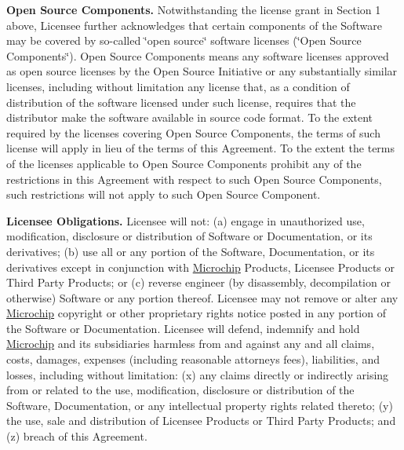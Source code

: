 \begin{DoxyEnumerate}
\item {\bfseries Open Source Components.} Notwithstanding the license grant in Section 1 above, Licensee further acknowledges that certain components of the Software may be covered by so-\/called \char`\"{}open source\char`\"{} software licenses (\char`\"{}\+Open Source Components\char`\"{}). Open Source Components means any software licenses approved as open source licenses by the Open Source Initiative or any substantially similar licenses, including without limitation any license that, as a condition of distribution of the software licensed under such license, requires that the distributor make the software available in source code format. To the extent required by the licenses covering Open Source Components, the terms of such license will apply in lieu of the terms of this Agreement. To the extent the terms of the licenses applicable to Open Source Components prohibit any of the restrictions in this Agreement with respect to such Open Source Components, such restrictions will not apply to such Open Source Component.


\item {\bfseries Licensee Obligations.} Licensee will not\+: (a) engage in unauthorized use, modification, disclosure or distribution of Software or Documentation, or its derivatives; (b) use all or any portion of the Software, Documentation, or its derivatives except in conjunction with \hyperlink{namespace_microchip}{Microchip} Products, Licensee Products or Third Party Products; or (c) reverse engineer (by disassembly, decompilation or otherwise) Software or any portion thereof. Licensee may not remove or alter any \hyperlink{namespace_microchip}{Microchip} copyright or other proprietary rights notice posted in any portion of the Software or Documentation. Licensee will defend, indemnify and hold \hyperlink{namespace_microchip}{Microchip} and its subsidiaries harmless from and against any and all claims, costs, damages, expenses (including reasonable attorney\textquotesingle{}s fees), liabilities, and losses, including without limitation\+: (x) any claims directly or indirectly arising from or related to the use, modification, disclosure or distribution of the Software, Documentation, or any intellectual property rights related thereto; (y) the use, sale and distribution of Licensee Products or Third Party Products; and (z) breach of this Agreement.



\end{DoxyEnumerate}
